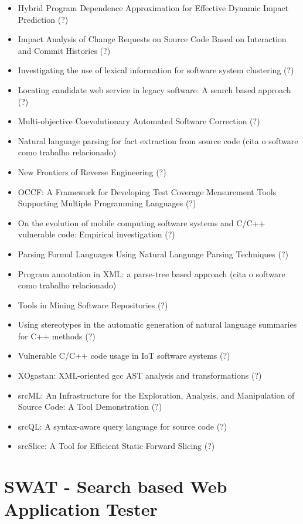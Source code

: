 \begin{itemize}
\item Hybrid Program Dependence Approximation for Effective Dynamic Impact Prediction (?)
\item Impact Analysis of Change Requests on Source Code Based on Interaction and Commit Histories (?)
\item Investigating the use of lexical information for software system clustering (?)
\item Locating candidate web service in legacy software: A search based approach (?)
\item Multi-objective Coevolutionary Automated Software Correction (?)
\item Natural language parsing for fact extraction from source code (cita o software como trabalho relacionado)
\item New Frontiers of Reverse Engineering (?)
\item OCCF: A Framework for Developing Test Coverage Measurement Tools Supporting Multiple Programming Languages (?)
\item On the evolution of mobile computing software systems and C/C++ vulnerable code: Empirical investigation (?)
\item Parsing Formal Languages Using Natural Language Parsing Techniques (?)
\item Program annotation in XML: a parse-tree based approach (cita o software como trabalho relacionado)
\item Tools in Mining Software Repositories (?)
\item Using stereotypes in the automatic generation of natural language summaries for C++ methods (?)
\item Vulnerable C/C++ code usage in IoT software systems (?)
\item XOgastan: XML-oriented gcc AST analysis and transformations (?)
\item srcML: An Infrastructure for the Exploration, Analysis, and Manipulation of Source Code: A Tool Demonstration (?)
\item srcQL: A syntax-aware query language for source code (?)
\item srcSlice: A Tool for Efficient Static Forward Slicing (?)
\end{itemize}

\section{SWAT - Search based Web Application Tester}

